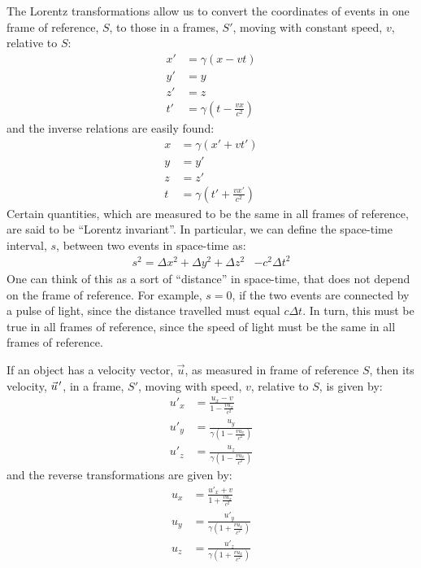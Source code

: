 \begin{chapterSummary}
The Lorentz transformations allow us to convert the coordinates of events in one frame of reference, $S$, to those in a frames, $S'$, moving with constant speed, $v$, relative to $S$:
\begin{align*}
x' &=\gamma (x-vt)\\
y' &= y\\
z' &= z\\
t' &=\gamma\left(t-\frac{vx}{c^2} \right)
\end{align*}
and the inverse relations are easily found:
\begin{align*}
x &=\gamma (x'+vt')\\
y &= y'\\
z &= z'\\
t &=\gamma\left(t'+\frac{vx'}{c^2} \right)
\end{align*}
Certain quantities, which are measured to be the same in all frames of reference, are said to be ``Lorentz invariant''. In particular, we can define the space-time interval, $s$, between two events in space-time as:
\begin{align*}
s^2 = \Delta x^2 + \Delta y^2 +\Delta z^2&-c^2\Delta t^2
\end{align*}
One can think of this as a sort of ``distance'' in space-time, that does not depend on the frame of reference. For example, $s=0$, if the two events are connected by a pulse of light, since the distance travelled must equal $c\Delta t$. In turn, this must be true in all frames of reference, since the speed of light must be the same in all frames of reference.

If an object has a velocity vector, $\vec u$, as measured in frame of reference $S$, then its velocity, $\pvec u'$, in a frame, $S'$, moving with speed, $v$, relative to $S$, is given by:
\begin{align*}
u'_x&=\frac{u_x -v}{1- \frac{vu_x}{c^2}}\\
u'_y &=\frac{u_y}{\gamma\left(1- \frac{vu_x}{c^2}\right)}\\
u'_z &=\frac{u_z}{\gamma\left(1- \frac{vu_x}{c^2}\right)}
\end{align*}
and the reverse transformations are given by:
\begin{align*}
u_x &=\frac{u'_x +v}{1+ \frac{vu_x}{c^2}}\\
u_y &=\frac{u'_y}{\gamma\left(1+ \frac{vu_x}{c^2}\right)}\\
u_z &=\frac{u'_z}{\gamma\left(1+ \frac{vu_x}{c^2}\right)}
\end{align*}


\end{chapterSummary}
